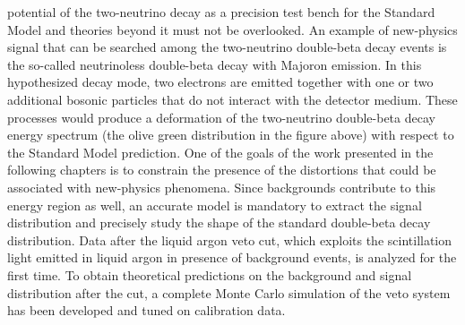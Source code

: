 potential of the two-neutrino decay as a precision test bench for the Standard Model and
theories beyond it must not be overlooked. An example of new-physics signal that
can be searched among the two-neutrino double-beta decay events is the so-called
neutrinoless double-beta decay with Majoron emission. In this hypothesized decay mode, two
electrons are emitted together with one or two additional bosonic particles that do not
interact with the detector medium. These processes would produce a deformation of the
two-neutrino double-beta decay energy spectrum (the olive green distribution in the figure
above) with respect to the Standard Model prediction.  One of the goals of the work
presented in the following chapters is to constrain the presence of the distortions that
could be associated with new-physics phenomena. Since backgrounds contribute to this
energy region as well, an accurate model is mandatory to extract the signal distribution
and precisely study the shape of the standard double-beta decay distribution. Data after
the liquid argon veto cut, which exploits the scintillation light emitted in liquid argon
in presence of background events, is analyzed for the first time.  To obtain theoretical
predictions on the background and signal distribution after the cut, a complete Monte
Carlo simulation of the veto system has been developed and tuned on calibration data.

